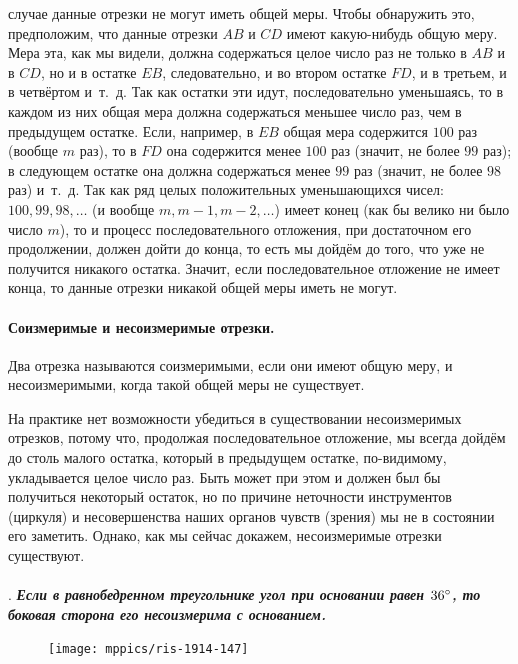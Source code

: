 \documentclass[twoside]{book}
\begin{document}
\smallskip
{} случае данные отрезки не могут иметь общей меры.
Чтобы обнаружить это, предположим, что данные отрезки $AB$ и $CD$ имеют какую-нибудь общую меру.
Мера эта, как мы видели, должна содержаться целое число раз не только в $AB$ и в $CD$, но и в остатке $EB$, следовательно, и во втором остатке $FD$, и в третьем, и в четвёртом и~т.~д.
Так как остатки эти идут, последовательно уменьшаясь, то в каждом из них общая мера должна содержаться меньшее число раз, чем в предыдущем остатке.
Если, например, в $EB$ общая мера содержится $100$ раз (вообще $m$ раз), то в $FD$ она содержится менее $100$ раз (значит, не более $99$ раз);
в следующем остатке она должна содержаться менее $99$ раз (значит, не более $98$ раз) и~т.~д.
Так как ряд целых положительных уменьшающихся чисел:
$100, 99, 98, \dots$
(и вообще $m, m-1, m-2,\dots$) имеет конец (как бы велико ни было число $m$), то и процесс последовательного отложения, при достаточном его продолжении, должен дойти до конца, то есть мы дойдём до того, что уже не получится никакого остатка.
Значит, если последовательное отложение не имеет конца, то данные отрезки никакой общей меры иметь не могут.

\paragraph{Соизмеримые и несоизмеримые отрезки.}\label{1938/148}
Два отрезка называются соизмеримыми, если они имеют общую меру, и несоизмеримыми, когда такой общей меры не существует.

На практике нет возможности убедиться в существовании несоизмеримых отрезков, потому что, продолжая последовательное отложение, мы всегда дойдём до столь малого остатка, который в предыдущем остатке, по-видимому, укладывается целое число раз.
Быть может при этом и должен был бы получиться некоторый остаток, но по причине неточности инструментов (циркуля) и несовершенства наших органов чувств (зрения) мы не в состоянии его заметить.
Однако, как мы сейчас докажем, несоизмеримые отрезки существуют.


\paragraph{}\label{1914/156}
.
\textbf{\emph{Если в равнобедренном треугольнике угол при основании равен $36\degree$, то боковая сторона его несоизмерима с основанием.}}

\begin{figure}
\centering
\texttt{[image: mppics/ris-1914-147]}
\caption{}\label{1914/ris-147}
\end{figure}
\end{document}
